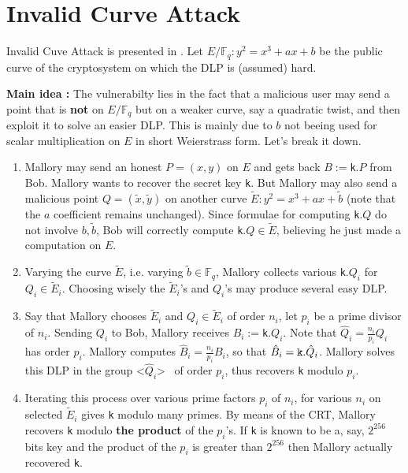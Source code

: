 \documentclass[10pt]{article}
\theoremstyle{definition}
\newcommand{\F}{\mathbb{F}}
\begin{document}
\section{Invalid Curve Attack}

Invalid Cuve Attack is presented in \cite{FLRV08}.
Let $E/\F_q : y^2 = x^3+ax+b$ be the public curve of the cryptosystem on which the DLP is (assumed) hard.

\vspace*{.5cm}
\textbf{Main idea :} The vulnerabilty lies in the fact that a malicious user may send a point that is \textbf{not} on $E/\F_q$ but on a weaker curve, say a quadratic twist, and then exploit it to solve an easier DLP.
This is mainly due to $b$ not beeing used for scalar multiplication on $E$ in short Weierstrass form.
Let's break it down.

\begin{enumerate}
\item Mallory may send an honest $P = (x,y)$ on $E$ and gets back $B:=$\verb|k|$.P$ from Bob.
Mallory wants to recover the secret key \verb|k|.
But Mallory may also send a malicious point $Q = ( \tilde{x},\tilde{y})$ 
on another curve $\tilde{E} : y^2 = x^3+ax+\tilde{b}$ (note that the $a$ coefficient remains unchanged).
Since formulae for computing \verb|k|$.Q$ do not involve $b, \tilde{b}$, Bob will correctly compute \verb|k|$.Q \in \tilde{E}$, believing he just made a computation on $E$.
\item Varying the curve $\tilde{E}$,  i.e. varying $\tilde{b} \in \F_q$, Mallory collects various \verb|k|$.Q_i$ for $Q_i \in \tilde{E}_i$.
Choosing wisely the $\tilde{E}_i$'s and $Q_i$'s may produce several easy DLP.
\item Say that Mallory chooses $\tilde{E}_i$ and  $Q_i \in \tilde{E}_i$ of order $n_i$, let $p_i$ be a prime divisor of $n_i$.
Sending $Q_i$ to Bob, Mallory receives $B_i:=$\verb|k|$.Q_i$.
Note that $\hat{Q}_i=\frac{n_i}{p_i}Q_i$ has order $p_i$.
Mallory computes $\hat{B}_i=\frac{n_i}{p_i}B_i$, so that $\hat{B}_i =  \verb|k|.\hat{Q}_i$.
Mallory solves this DLP in the group \textless$\hat{Q}_i$\textgreater~ of order $p_i$, thus recovers \verb|k| modulo $p_i$. 
\item Iterating this process over various prime factors $p_i$ of $n_i$, for various $n_i$ on selected $\tilde{E}_i$ gives \verb|k| modulo many primes.
By means of the CRT, Mallory recovers \verb|k| modulo \textbf{the product} of the $p_i$'s.
If \verb|k| is known to be a, say, $2^{256}$ bits key and the product of the $p_i$ is greater than $2^{256}$ then Mallory actually recovered  \verb|k|.
\end{enumerate}
\end{document}
